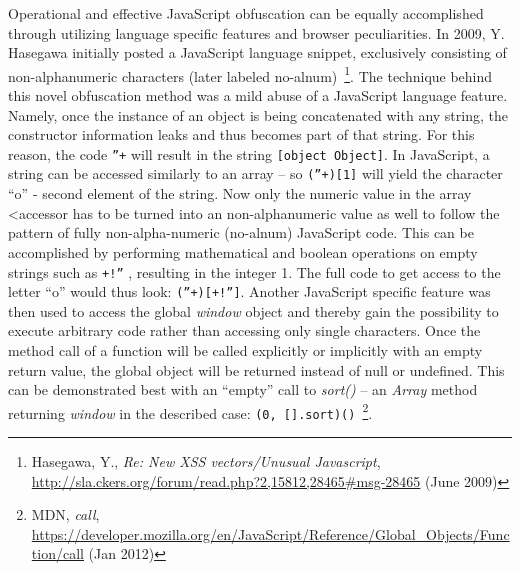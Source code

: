    Operational and effective JavaScript obfuscation can be equally accomplished through utilizing language specific features and browser peculiarities. In 2009, Y. Hasegawa initially posted a JavaScript language snippet, exclusively consisting of non-alphanumeric characters (later labeled no-alnum)~\footnote{Hasegawa, Y., \textit{Re: New XSS vectors/Unusual Javascript}, \url{http://sla.ckers.org/forum/read.php?2,15812,28465#msg-28465} (June 2009)}. The technique behind this novel obfuscation method was a mild abuse of a JavaScript language feature. Namely, once the instance of an object is being concatenated with any string, the constructor information leaks and thus becomes part of that string. For this reason, the code \texttt{''+{}} will result in the string \texttt{[object Object]}. In JavaScript, a string can be accessed similarly to an array -- so \texttt{(''+{})[1]} will yield the character ``o'' - second element of the string. Now only the numeric value in the array <accessor has to be turned into 
an non-alphanumeric value as well to follow the pattern of fully non-alpha-numeric (no-alnum) JavaScript code. This can be accomplished by performing mathematical and boolean operations on empty strings such as \texttt{+!''} , resulting in the integer 1. The full code to get access to the letter ``o'' would thus look: \texttt{(''+{})[+!'']}. Another JavaScript specific feature was then used to access the global \textit{window} object and thereby gain the possibility to execute arbitrary code rather than accessing only single characters. Once the method call of a function will be called explicitly or implicitly with an empty return value, the global object will be returned instead of null or undefined. This can be demonstrated best with an ``empty'' call to \textit{sort()} -- an \textit{Array} method returning \textit{window} in the described case: \texttt{(0, [].sort)()}~\footnote{MDN, \textit{call}, \url{https://developer.mozilla.org/en/JavaScript/Reference/Global_Objects/Function/call} (Jan 2012)}. \\

